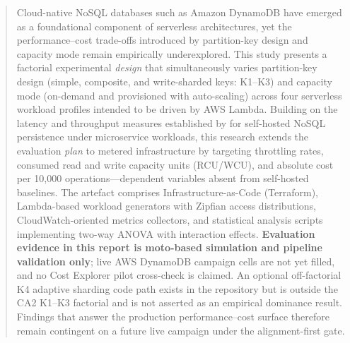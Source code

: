 \begin{abstract}
Cloud-native NoSQL databases such as Amazon DynamoDB have emerged as a foundational component of serverless architectures, yet the performance–cost trade-offs introduced by partition-key design and capacity mode remain empirically underexplored. This study presents a factorial experimental \emph{design} that simultaneously varies partition-key design (simple, composite, and write-sharded keys: K1--K3) and capacity mode (on-demand and provisioned with auto-scaling) across four serverless workload profiles intended to be driven by AWS Lambda. Building on the latency and throughput measures established by \citet{pantelic2026benchmarking} for self-hosted NoSQL persistence under microservice workloads, this research extends the evaluation \emph{plan} to metered infrastructure by targeting throttling rates, consumed read and write capacity units (RCU/WCU), and absolute cost per 10,000 operations---dependent variables absent from self-hosted baselines. The artefact comprises Infrastructure-as-Code (Terraform), Lambda-based workload generators with Zipfian access distributions, CloudWatch-oriented metrics collectors, and statistical analysis scripts implementing two-way ANOVA with interaction effects. \textbf{Evaluation evidence in this report is moto-based simulation and pipeline validation only}; live AWS DynamoDB campaign cells are not yet filled, and no Cost Explorer pilot cross-check is claimed. An optional off-factorial K4 adaptive sharding code path exists in the repository but is outside the CA2 K1--K3 factorial and is not asserted as an empirical dominance result. Findings that answer the production performance--cost surface therefore remain contingent on a future live campaign under the alignment-first gate.
\end{abstract}
